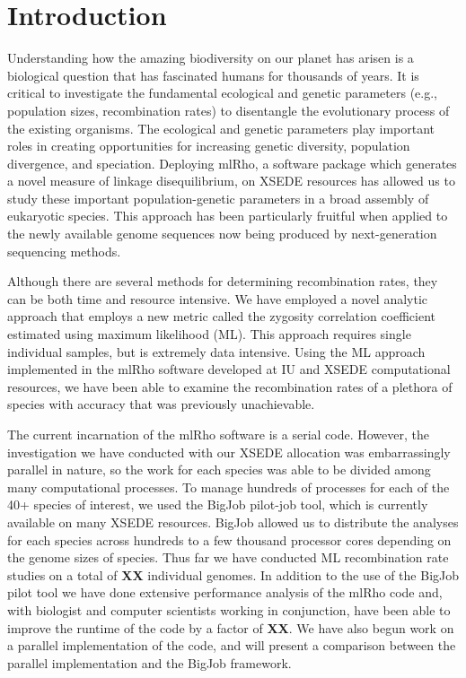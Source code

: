 \documentclass{sig-alternate}
\begin{document}
\section{Introduction}
Understanding how the amazing biodiversity on our planet has arisen is a biological question that has
fascinated humans for thousands of years. It is critical to investigate the fundamental ecological and genetic
parameters (e.g., population sizes, recombination rates) to disentangle the evolutionary process of the
existing organisms. The ecological and genetic parameters play important roles in creating opportunities for
increasing genetic diversity, population divergence, and speciation. Deploying mlRho, a software package which
generates a novel measure of linkage disequilibrium, on XSEDE resources has allowed us to study these
important population-genetic parameters in a broad assembly of eukaryotic species. This approach has been
particularly fruitful when applied to the newly available genome sequences now being produced by
next-generation sequencing methods.

Although there are several methods for determining recombination rates, they can be both time and resource
intensive. We have employed a novel analytic approach that employs a new metric called the zygosity
correlation coefficient estimated using maximum likelihood (ML). This approach requires single individual
samples, but is extremely data intensive. Using the ML approach implemented in the mlRho software developed at
IU and XSEDE computational resources, we have been able to examine the recombination rates of a plethora of
species with accuracy that was previously unachievable.

The current incarnation of the mlRho software is a serial code. However, the investigation we have conducted
with our XSEDE allocation was embarrassingly parallel in nature, so the work for each species was able to be
divided among many computational processes. To manage hundreds of processes for each of the 40+ species of
interest, we used the BigJob pilot-job tool, which is currently available on many XSEDE resources. BigJob
allowed us to distribute the analyses for each species across hundreds to a few thousand processor cores
depending on the genome sizes of species. Thus far we have conducted ML recombination rate studies on a total
of {\bf XX} individual genomes. In addition to the use of the BigJob pilot tool we have done extensive performance
analysis of the mlRho code and, with biologist and computer scientists working in conjunction, have been able
to improve the runtime of the code by a factor of {\bf XX}. We have also begun work on a parallel
implementation of the code, and will present a comparison between the parallel implementation and the BigJob
framework.
\end{document}
